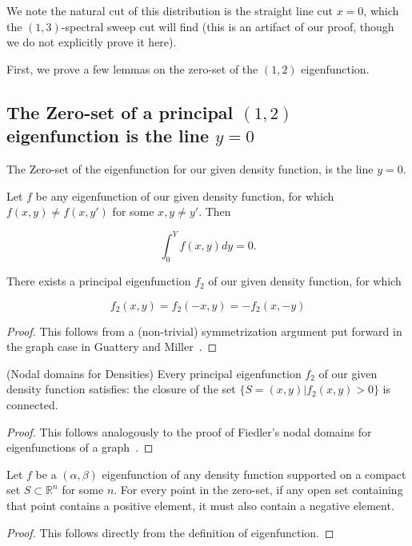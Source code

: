 We note the natural cut of this distribution is the straight line cut $x =
0$, which the $(1,3)$-spectral sweep cut will find (this is an artifact
of our proof, though we do not explicitly prove it here).

First, we prove a few lemmas on the zero-set of the $(1,2)$
eigenfunction.
\subsection{The Zero-set of a principal $(1,2)$ eigenfunction is the
line $y = 0$} 

\begin{theorem} \label{thm:zero-set} The Zero-set of the eigenfunction for our given density
  function, is the line $y = 0$.
\end{theorem}
\begin{lemma} Let $f$ be any eigenfunction of our given density function,
  for which $f(x,y) \not= f(x, y')$ for some $x, y \not= y'$. Then
  
  \[ \int_0^Y f(x,y) dy  = 0. \]
\end{lemma}

\begin{lemma}\label{lem:symmetry} There exists a principal eigenfunction $f_2$ of our given
  density function, for which 

  \[f_2(x,y) = f_2 (-x, y) = -f_2(x,-y)\]

\end{lemma}

\begin{proof} This follows from a (non-trivial) symmetrization argument put forward in
  the graph case in Guattery and Miller~\cite{GuMi95}.
\end{proof}

\begin{lemma}\label{lem:nodal} (Nodal domains for Densities) Every principal eigenfunction $f_2$ of our given density
  function satisfies: the closure of the set $\{S = (x,y) | f_2(x,y)
  > 0\}$ is connected.
\end{lemma}
\begin{proof} This follows analogously to the proof of Fiedler's nodal
  domains for eigenfunctions of a graph~\cite{Fiedler73}.
\end{proof}

  \begin{lemma}  \label{lem:pos-neg} Let $f$ be a $(\alpha, \beta)$ eigenfunction of any density function
  supported on a compact set $S \subset \mathbb{R}^n$ for some $n$.
  For every point in the zero-set, if any open set containing that point
  contains a positive element, it must also contain a negative element.
\end{lemma}
\begin{proof}
  This follows directly from the definition of eigenfunction.
\end{proof}

